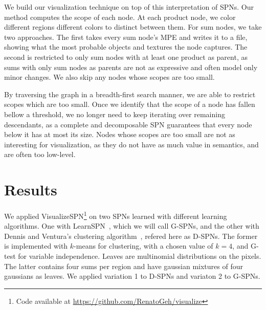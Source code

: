 \documentclass{article}
\begin{document}
We build our visualization technique on top of this interpretation of SPNs. Our method computes the
scope of each node. At each product node, we color different regions different colors to distinct
between them. For sum nodes, we take two approaches. The first takes every sum node's MPE and
writes it to a file, showing what the most probable objects and textures the node captures. The
second is restricted to only sum nodes with at least one product as parent, as sums with only sum
nodes as parents are not as expressive and often model only minor changes. We also skip any nodes
whose scopes are too small.

By traversing the graph in a breadth-first search manner, we are able to restrict scopes which are
too small. Once we identify that the scope of a node has fallen bellow a threshold, we no longer
need to keep iterating over remaining descendants, as a complete and decomposable SPN guarantees
that every node below it has at most its size. Nodes whose scopes are too small are not as
interesting for visualization, as they do not have as much value in semantics, and are often too
low-level.

\section{Results}
\label{sec:results}

We applied VisualizeSPN\footnote{\scriptsize Code available at
\url{https://github.com/RenatoGeh/visualize}} on two SPNs learned with different learning
algorithms. One with LearnSPN~\cite{gens13}, which we will call G-SPNs, and the other with Dennis
and Ventura's clustering algorithm~\cite{dennis12}, refered here as D-SPNs. The former is
implemented with $k$-means for clustering, with a chosen value of $k=4$, and G-test for variable
independence.  Leaves are multinomial distributions on the pixels.  The latter contains four sums
per region and have gaussian mixtures of four gaussians as leaves. We applied variation 1 to D-SPNs
and variaton 2 to G-SPNs.
\end{document}
